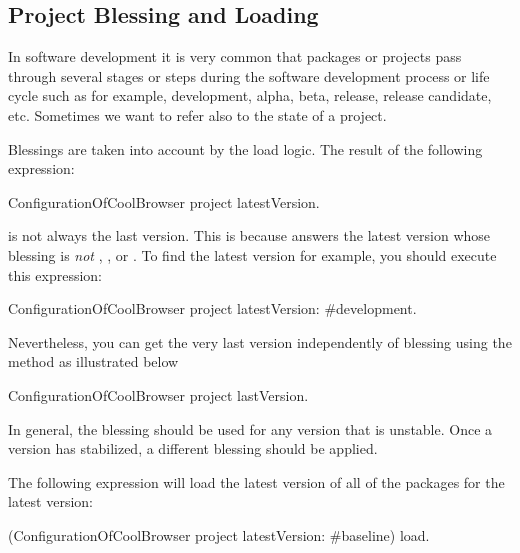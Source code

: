 \documentclass[a4paper,10pt,twoside]{book}
\begin{document}

    
    
    
    
    
\subsection{Project Blessing and Loading}

In software development it is very common that packages or projects pass through several stages or steps during the software development process or life cycle such as for example, development, alpha, beta,  release, release candidate, etc. Sometimes we want to refer also to the state of a project.

Blessings are taken into account by the load logic. The result of the following expression:
\begin{code}{}
ConfigurationOfCoolBrowser project latestVersion.
\end{code}
is not always the last version.  This is because  answers the latest version whose blessing is {\em not} , , or . To find the latest  version for example, you should execute this expression:

\begin{code}{}
ConfigurationOfCoolBrowser project latestVersion: #development.
\end{code}

Nevertheless, you can get the very last version independently of blessing using the  method as illustrated below

\begin{code}{}
ConfigurationOfCoolBrowser project lastVersion.
\end{code}

In general, the  blessing should be used for any version that is unstable. Once a version has stabilized, a different blessing should be applied.

The following expression will load the latest version of all of the packages for the latest  version:
 \begin{code}{}
(ConfigurationOfCoolBrowser project latestVersion: #baseline) load.
\end{code}
\end{document}
